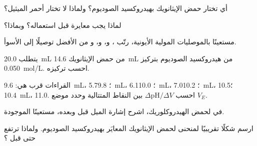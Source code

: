 \begin{exercise}[$\star$]\label{exo:g12:ph-conductivity-titrations:3}
أي  تختار  حمض الإيثانويك بهيدروكسيد
الصوديوم؟ ولماذا لا تختار أحمر الميثيل؟
\end{exercise}

\begin{exercise}[$\star$]\label{exo:g12:ph-conductivity-titrations:4}
لماذا يجب معايرة  قبل استعماله؟ وبماذا؟
\end{exercise}

\begin{exercise}[$\star$]\label{exo:g12:ph-conductivity-titrations:5}
مستعينًا بالموصليات المولية الأيونية، رتّب  ، و،
و، و من الأفضل توصيلًا إلى الأسوأ.
\end{exercise}

\begin{exercise}[$\star\star$]\label{exo:g12:ph-conductivity-titrations:6}
يتطلب \qty{20.0}{mL} من  حمض الإيثانويك \qty{14.6}{mL} من
هيدروكسيد الصوديوم بتركيز \qty{0.050}{mol/L}. احسب تركيزه.
\end{exercise}

\begin{exercise}[$\star\star$]\label{exo:g12:ph-conductivity-titrations:7}
القراءات قرب  هي: \qty{9.6}{mL}،  5.7؛
\qty{9.8}{mL}، 6.1؛ \qty{10.0}{mL}، 7.0؛ \qty{10.2}{mL}، 10.5؛
\qty{10.4}{mL}، 11.0. احسب $\Delta\mathrm{pH}/\Delta V$ بين
النقاط المتتالية وحدد موضع $V_E$.
\end{exercise}

\begin{exercise}[$\star\star$]\label{exo:g12:ph-conductivity-titrations:8}
في  لحمض الهيدروكلوريك، اشرح إشارة
الميل قبل  وبعده، مستعينًا  الموجودة.
\end{exercise}

\begin{exercise}[$\star\star$]\label{exo:g12:ph-conductivity-titrations:9}
ارسم شكلًا تقريبيًا لمنحنى  لحمض الإيثانويك المعايَر بهيدروكسيد
الصوديوم. ولماذا ترتفع  حتى قبل ؟
\end{exercise}

